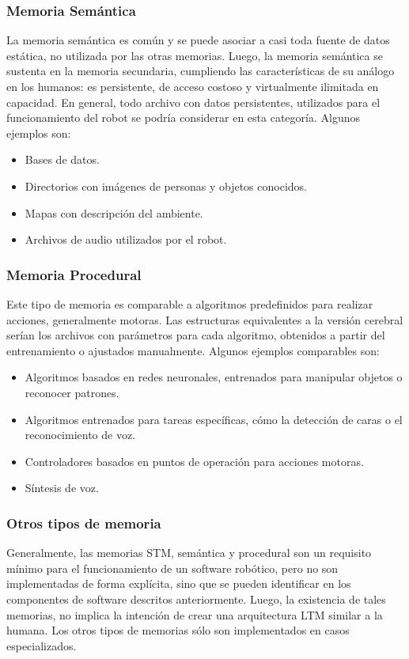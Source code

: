 \subsubsection{Memoria Semántica}
La memoria semántica es común y se puede asociar a casi toda fuente de datos estática, no utilizada por las otras memorias. Luego, la memoria semántica se sustenta en la memoria secundaria, cumpliendo las características de su análogo en los humanos: es persistente, de acceso costoso y virtualmente ilimitada en capacidad. En general, todo archivo con datos persistentes, utilizados para el funcionamiento del robot se podría considerar en esta categoría. Algunos ejemplos son:
\begin{itemize}
	\item Bases de datos.
	\item Directorios con imágenes de personas y objetos conocidos.
	\item Mapas con descripción del ambiente.
	\item Archivos de audio utilizados por el robot.
\end{itemize}


\subsubsection{Memoria Procedural}
Este tipo de memoria es comparable a algoritmos predefinidos para realizar acciones, generalmente motoras. Las estructuras equivalentes a la versión cerebral serían los archivos con parámetros para cada algoritmo, obtenidos a partir del entrenamiento o ajustados manualmente. Algunos ejemplos comparables son: 
\begin{itemize}
	\item Algoritmos basados en redes neuronales, entrenados para manipular objetos o reconocer patrones.
	\item Algoritmos entrenados para tareas específicas, cómo la detección de caras o el reconocimiento de voz.
	\item Controladores basados en puntos de operación para acciones motoras.
	\item Síntesis de voz.
\end{itemize}


\subsubsection{Otros tipos de memoria}
Generalmente, las memorias STM, semántica y procedural son un requisito mínimo para el funcionamiento de un software robótico, pero no son implementadas de forma explícita, sino que se pueden identificar en los componentes de software descritos anteriormente. Luego, la existencia de tales memorias, no implica la intención de crear una arquitectura LTM similar a la humana. Los otros tipos de memorias sólo son implementados en casos especializados.



